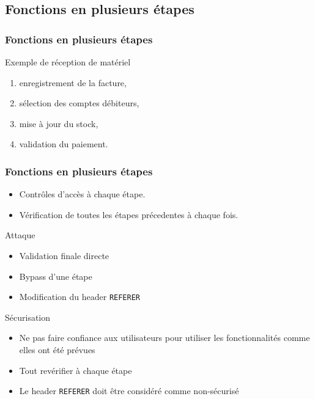 \documentclass{beamer}
\begin{document}
\subsection{Fonctions en plusieurs étapes}
\begin{frame}
  \frametitle{Fonctions en plusieurs étapes}
  \begin{block}{Exemple de réception de matériel}
    \begin{enumerate}
        \item enregistrement de la facture,
        \item sélection des comptes débiteurs,
        \item mise à jour du stock,
        \item validation du paiement.
    \end{enumerate}
  \end{block}
\end{frame}
\begin{frame}
  \frametitle{Fonctions en plusieurs étapes}  
  \begin{itemize}
    \item Contrôles d'accès à chaque étape.
    \item Vérification de toutes les étapes précedentes à chaque fois.
  \end{itemize}
  \begin{alertblock}{Attaque}
    \begin{itemize}
      \item Validation finale directe
      \item Bypass d'une étape
      \item Modification du header \texttt{REFERER}
    \end{itemize}
  \end{alertblock}
  \begin{exampleblock}{Sécurisation}
    \begin{itemize}
      \item Ne pas faire confiance aux utilisateurs pour utiliser les fonctionnalités comme elles ont été prévues
      \item Tout revérifier à chaque étape
      \item Le header \texttt{REFERER} doit être considéré comme non-sécurisé
    \end{itemize}
  \end{exampleblock}
  
\end{frame}
\end{document}
